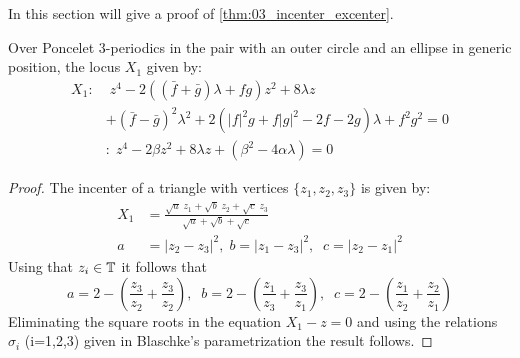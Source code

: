 


In this section will give a proof of \cref{thm:03_incenter_excenter}.

\begin{proposition}\label{prop:X1c}
Over Poncelet 3-periodics in the pair with an outer circle and an ellipse in generic position, the locus $X_1$ given by:
\begin{align*}
  X_1:&\;z^4 - 2(( \bar{f} + \bar{g}) \lambda +  f g) z^2 + 8   \lambda z\\
  &+ (\bar{f} - \bar{g})^2 \lambda^2 +2 (  |f|^2 g +   f |g|^2 - 2 f - 2 g) \lambda + f^2 g^2=0\\
  \;&:\;  z^4 - 2\beta  z^2+ 8\lambda z+  (\beta^2-4\alpha\lambda) =0
\end{align*}
\end{proposition}

\begin{proof} The incenter of a triangle with vertices $\{z_1,z_2,z_3\}$ is given by:
\begin{align*}
    X_1&=\frac{\sqrt{a}\;z_1+\sqrt{b}\;z_2+\sqrt{c}\;z_3}{\sqrt{a}+\sqrt{b}+\sqrt{c}}\\
    a&=|z_2-z_3|^2, \; b=|z_1-z_3|^2, \;\; c=|z_2-z_1|^2
\end{align*}
Using that $z_i\in \mathbb{T}$ it follows that
\[a=2-(\frac{z_3}{z_2}+\frac{z_3}{z_2}),\;\; b=2-(\frac{z_1}{z_3}+\frac{z_3}{z_1}),\;\;c=2-(\frac{z_1}{z_2}+\frac{z_2}{z_1})\]
Eliminating the square roots in  the equation $X_1-z=0$ and using the relations  $\sigma_i$ (i=1,2,3) given in Blaschke's parametrization the result follows.
\end{proof}

